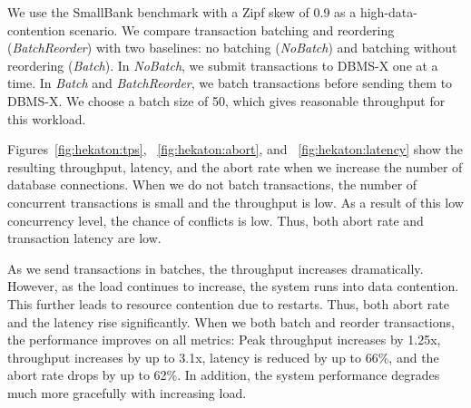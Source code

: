 {

We use the SmallBank benchmark with a Zipf skew of 0.9 as a high-data-contention scenario. We compare transaction batching and reordering (\emph{BatchReorder}) with two baselines: no batching (\emph{NoBatch}) and batching without reordering (\emph{Batch}). In \emph{NoBatch}, we submit transactions to DBMS-X one at a time. In \emph{Batch} and \emph{BatchReorder}, we batch transactions before sending them to DBMS-X. We choose a batch size of 50, which gives reasonable throughput for this workload.

Figures~\ref{fig:hekaton:tps}, ~\ref{fig:hekaton:abort}, and ~\ref{fig:hekaton:latency} show the resulting throughput, latency, and the abort rate when we increase the number of database connections.  When we do not batch transactions, the number of concurrent transactions is small and the throughput is low. As a result of this low concurrency level, the chance of conflicts is low. Thus, both abort rate and transaction latency are low. 

As we send transactions in batches, the throughput increases dramatically. 
However, as the load continues to increase, the system runs into data contention. This further leads to resource contention due to restarts. Thus, both abort rate and the latency rise significantly. When we both batch and reorder transactions, the performance improves on all metrics: Peak throughput increases by 1.25x, throughput increases by up to 3.1x, latency is reduced by up to 66\%, and the abort rate drops by up to 62\%. In addition, the system performance degrades much more gracefully with increasing load.
}